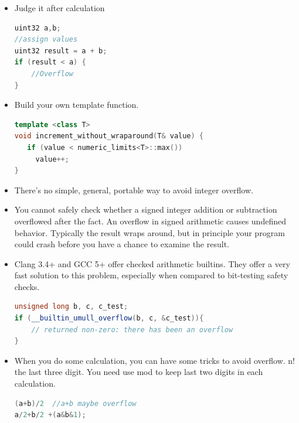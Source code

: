 \documentclass[a4paper,12pt,twoside]{book}
\begin{document}
\begin{itemize}
\begin{lstlisting}[frame=single, language=c++]
if (a > INT_MAX / x) /* `a * x` would overflow */;
if ((a < INT_MIN / x)) /* `a * x` would underflow */;
// need to check for -1 for two's complement machines
if ((a == -1) && (x == INT_MIN)) /* `a * x` overflow */
if ((x == -1) && (a == INT_MIN)) /* `a * x` (or `a / x`) overflow */
\end{lstlisting}

\item Judge it after calculation
\begin{lstlisting}[frame=single, language=c++]
uint32 a,b;
//assign values
uint32 result = a + b;
if (result < a) {
    //Overflow
}
\end{lstlisting}

\item Build your own template function.
\begin{lstlisting}[frame=single, language=c++]
template <class T>
void increment_without_wraparound(T& value) {
   if (value < numeric_limits<T>::max())
     value++;
}
\end{lstlisting}

\item There's no simple, general, portable way to avoid integer overflow.
\item You cannot safely check whether a signed integer addition or subtraction overflowed after the fact. An overflow in signed arithmetic causes undefined behavior. Typically the result wraps around, but in principle your program could crash before you have a chance to examine the result.

\item Clang 3.4+ and GCC 5+ offer checked arithmetic builtins. They offer a very fast solution to this problem, especially when compared to bit-testing safety checks.
\begin{lstlisting}[frame=single, language=c++]
unsigned long b, c, c_test;
if (__builtin_umull_overflow(b, c, &c_test)){
    // returned non-zero: there has been an overflow
}
\end{lstlisting}

\item When you do some calculation, you can have some tricks to avoid overflow. n! the last three digit. You need use mod to keep last two digits in each calculation.
\begin{lstlisting}[frame=single, language=c++]
(a+b)/2  //a+b maybe overflow
a/2+b/2 +(a&b&1);
\end{lstlisting}

\end{itemize}
\end{document}
